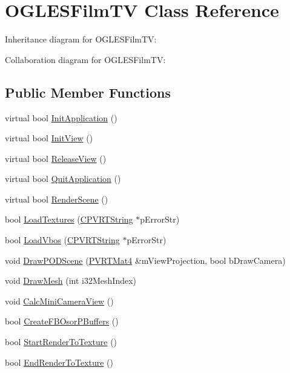 \hypertarget{class_o_g_l_e_s_film_t_v}{\section{O\+G\+L\+E\+S\+Film\+T\+V Class Reference}
\label{class_o_g_l_e_s_film_t_v}
}


Inheritance diagram for O\+G\+L\+E\+S\+Film\+T\+V\+:


Collaboration diagram for O\+G\+L\+E\+S\+Film\+T\+V\+:
\subsection*{Public Member Functions}
\begin{DoxyCompactItemize}
\item 
virtual bool \hyperlink{class_o_g_l_e_s_film_t_v_abad4690b9dcc013950dac8e991dd34f9}{Init\+Application} ()
\item 
virtual bool \hyperlink{class_o_g_l_e_s_film_t_v_a1ea5268db0b745d827dde1ecc543a08b}{Init\+View} ()
\item 
virtual bool \hyperlink{class_o_g_l_e_s_film_t_v_a60ee9a779d4592ff019d6c096db7268e}{Release\+View} ()
\item 
virtual bool \hyperlink{class_o_g_l_e_s_film_t_v_a66baee4b7ee87785d8f5350926c868b3}{Quit\+Application} ()
\item 
virtual bool \hyperlink{class_o_g_l_e_s_film_t_v_afaa4921be2dc267b7783b3d2d11366f7}{Render\+Scene} ()
\item 
bool \hyperlink{class_o_g_l_e_s_film_t_v_adb417d352deedf0a4cbc7ab2db274682}{Load\+Textures} (\hyperlink{class_c_p_v_r_t_string}{C\+P\+V\+R\+T\+String} $\ast$p\+Error\+Str)
\item 
bool \hyperlink{class_o_g_l_e_s_film_t_v_aee34bc2bbbd617aa839c174a5f6a8617}{Load\+Vbos} (\hyperlink{class_c_p_v_r_t_string}{C\+P\+V\+R\+T\+String} $\ast$p\+Error\+Str)
\item 
void \hyperlink{class_o_g_l_e_s_film_t_v_a27203672f453675e4ca051cad2b61387}{Draw\+P\+O\+D\+Scene} (\hyperlink{struct_p_v_r_t_mat4}{P\+V\+R\+T\+Mat4} \&m\+View\+Projection, bool b\+Draw\+Camera)
\item 
void \hyperlink{class_o_g_l_e_s_film_t_v_ae493c864ac11779b3d2643b358ce13b1}{Draw\+Mesh} (int i32\+Mesh\+Index)
\item 
void \hyperlink{class_o_g_l_e_s_film_t_v_a39998c793f2f385a02e13021b06ebc3b}{Calc\+Mini\+Camera\+View} ()
\item 
bool \hyperlink{class_o_g_l_e_s_film_t_v_a0e98480df4ae4a6cdb26c6e084c6ac07}{Create\+F\+B\+Osor\+P\+Buffers} ()
\item 
bool \hyperlink{class_o_g_l_e_s_film_t_v_ae822778d54f449aad843515c819f0134}{Start\+Render\+To\+Texture} ()
\item 
bool \hyperlink{class_o_g_l_e_s_film_t_v_aeac3542b6fb8b3b3cca41fde98c8aa3b}{End\+Render\+To\+Texture} ()
\end{DoxyCompactItemize}


